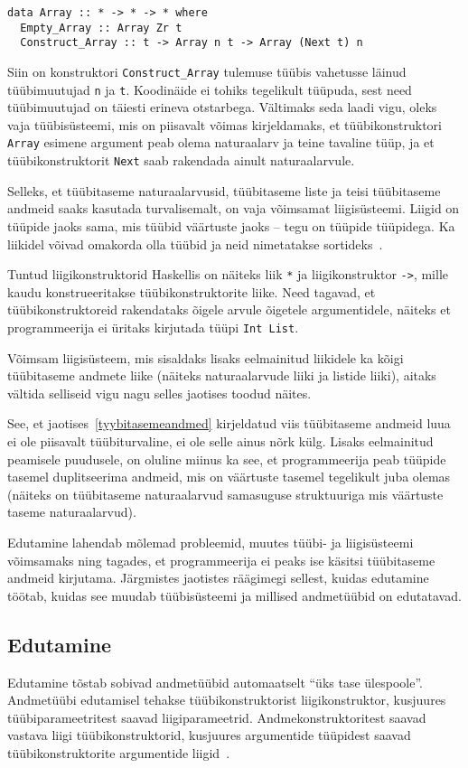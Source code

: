 \documentclass[12pt]{article}
\begin{document}
      \begin{verbatim}data Array :: * -> * -> * where
  Empty_Array :: Array Zr t
  Construct_Array :: t -> Array n t -> Array (Next t) n\end{verbatim}

      Siin on konstruktori \verb!Construct_Array! tulemuse tüübis vahetusse läinud tüübimuutujad \verb!n! ja \verb!t!. Koodinäide ei tohiks tegelikult tüüpuda, sest need tüübimuutujad on täiesti erineva otstarbega. Vältimaks seda laadi vigu, oleks vaja tüübisüsteemi, mis on piisavalt võimas kirjeldamaks, et tüübikonstruktori \verb!Array! esimene argument peab olema naturaalarv ja teine tavaline tüüp, ja et tüübikonstruktorit \verb!Next! saab rakendada ainult naturaalarvule.

      Selleks, et tüübitaseme naturaalarvusid, tüübitaseme liste ja teisi tüübitaseme andmeid saaks kasutada turvalisemalt, on vaja võimsamat liigisüsteemi. Liigid on tüüpide jaoks sama, mis tüübid väärtuste jaoks -- tegu on tüüpide tüüpidega. Ka liikidel võivad omakorda olla tüübid ja neid nimetatakse sortideks~\cite{Typ}.

      Tuntud liigikonstruktorid Haskellis on näiteks liik \verb!*! ja liigikonstruktor \verb!->!, mille kaudu konstrueeritakse tüübikonstruktorite liike. Need tagavad, et tüübikonstruktoreid rakendataks õigele arvule õigetele argumentidele, näiteks et programmeerija ei üritaks kirjutada tüüpi \verb!Int List!.

      Võimsam liigisüsteem, mis sisaldaks lisaks eelmainitud liikidele ka kõigi tüübitaseme andmete liike (näiteks naturaalarvude liiki ja listide liiki), aitaks vältida selliseid vigu nagu selles jaotises toodud näites.

      See, et jaotises~\ref{tyybitasemeandmed} kirjeldatud viis tüübitaseme andmeid luua ei ole piisavalt tüübiturvaline, ei ole selle ainus nõrk külg. Lisaks eelmainitud peamisele puudusele, on oluline miinus ka see, et programmeerija peab tüüpide tasemel duplitseerima andmeid, mis on väärtuste tasemel tegelikult juba olemas (näiteks on tüübitaseme naturaalarvud samasuguse struktuuriga mis väärtuste taseme naturaalarvud).

      Edutamine lahendab mõlemad probleemid, muutes tüübi- ja liigisüsteemi võimsamaks ning tagades, et programmeerija ei peaks ise käsitsi tüübitaseme andmeid kirjutama. Järgmistes jaotistes räägimegi sellest, kuidas edutamine töötab, kuidas see muudab tüübisüsteemi ja millised andmetüübid on edutatavad.
    \subsection{Edutamine}
      Edutamine tõstab sobivad andmetüübid automaatselt "`üks tase ülespoole"'. Andmetüübi edutamisel tehakse tüübikonstruktorist liigikonstruktor, kusjuures tüübiparameetritest saavad liigiparameetrid. Andmekonstruktoritest saavad vastava liigi tüübikonstruktorid, kusjuures argumentide tüüpidest saavad tüübikonstruktorite argumentide liigid~\cite{Giv}.
\end{document}
